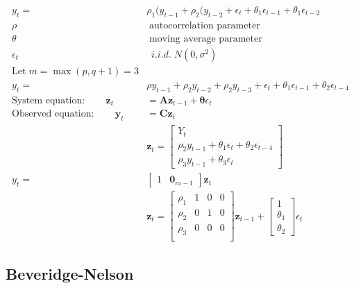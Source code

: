 \documentclass[11pt]{article}
\begin{document}
 \begin{align*}
    y_t = & \rho_1(y_{t-1}  +\rho_2(y_{t-2} +\epsilon_t + \theta_1 \epsilon_{t-1} + \theta_1 \epsilon_{t-2} \\
    \rho &\; \text{autocorrelation parameter} \\
    \theta & \; \text{moving average parameter} \\
    \epsilon_t & \; ~ i.i.d. \; N(0,\sigma^2) \\
    \text{Let} \; m=\max(p,q+1)=3 \\
y_t = & \rho y_{t-1} + \rho_2 y_{t-2} + \rho_2 y_{t-3}+\epsilon_t + \theta_1 \epsilon_{t-1} + \theta_2 \epsilon_{t-4} \\
    \text{System equation}: \qquad \mathbf{z}_t & = \mathbf{A} \mathbf{z}_{t-1}+ \mathbf{\theta} \epsilon_t \\
    \text{Observed equation}: \qquad \mathbf{y}_t & = \mathbf{C} \mathbf{z}_t \\
& \mathbf{z}_t = \begin{bmatrix}
    Y_t  \\
    \rho_2 y_{t-1} + \theta_1 \epsilon_{t} + \theta_2 \epsilon_{t-4} \\
    \rho_3 y_{t-1} + \theta_3 \epsilon_{t}
\end{bmatrix} \\
y_t = & \begin{bmatrix}
 1 & \mathbf{0}_{m-1}
\end{bmatrix} \mathbf{z}_t \\
 & \mathbf{z}_t = \begin{bmatrix}
 \rho_1 & 1 & 0 & 0 \\
 \rho_2 & 0 & 1 & 0 \\
 \rho_3 & 0 & 0 & 0 \\
\end{bmatrix} \mathbf{z}_{t-1} +
\begin{bmatrix}
 1 \\
 \theta_1 \\
 \theta_2  
\end{bmatrix} \epsilon_t
\end{align*}

\newpage
\subsection{Beveridge-Nelson}
\end{document}
